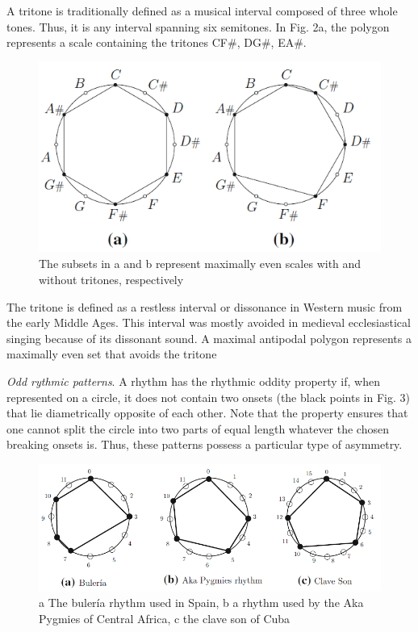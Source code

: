 \documentclass[twoside]{article}
\begin{document}
A tritone is traditionally defined as a musical interval
composed of three whole tones. Thus, it is any interval spanning six semitones. In
Fig. 2a, the polygon represents a scale containing the tritones CF$\#$, DG$\#$, EA$\#$.

\begin{figure}[h!]
\centering
\includegraphics[scale=0.7]{tritone}
\caption{The subsets in a and b represent maximally even scales with and without tritones, respectively}
\end{figure}

The
tritone is defined as a restless interval or dissonance in Western music from the early
Middle Ages. This interval was mostly avoided in medieval ecclesiastical singing
because of its dissonant sound. A maximal antipodal polygon
represents a maximally even set that avoids the tritone

\emph{Odd rythmic patterns}. A rhythm has the rhythmic oddity property if, when
represented on a circle, it does not contain two onsets (the black points in Fig. 3)
that lie diametrically opposite of each other. Note that the property ensures that one
cannot split the circle into two parts of equal length whatever the chosen breaking
onsets is. Thus, these patterns possess a particular type of asymmetry.

\begin{figure}[h!]
\centering
\includegraphics[scale=0.7]{rythm}
\caption{a The bulería rhythm used in Spain, b a rhythm used by the Aka Pygmies of Central Africa, c the
clave son of Cuba}
\end{figure}
\end{document}
